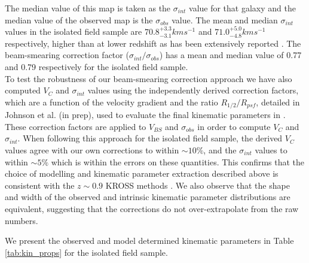 \documentclass[fleqn,usenatbib]{mn2e}
\begin{document}
The median value of this map is taken as the $\sigma_{int}$ value for that galaxy and the median value of the observed map is the $\sigma_{obs}$ value.
The mean and median $\sigma_{int}$ values in the isolated field sample are $70.8^{+3.3}_{-3.1} kms^{-1}$ and $71.0^{+5.0}_{-4.8} kms^{-1}$ respectively, higher than at lower redshift as has been extensively reported \citep[e.g.][]{Genzel2006,Genzel2008,ForsterSchreiber2009,Law2009,Gnerucci2011,Epinat2012,Wisnioski2015}.
The beam-smearing correction factor ($\sigma_{int}/\sigma_{obs}$) has a mean and median value of 0.77 and 0.79 respectively for the isolated field sample. \\

To test the robustness of our beam-smearing correction approach we have also computed $V_{C}$ and $\sigma_{int}$ values using the independently derived correction factors, which are a function of the velocity gradient and the ratio $R_{1/2}/R_{psf}$, detailed in Johnson et al. (in prep), used to evaluate the final kinematic parameters in \cite{Harrison2017}.
These correction factors are applied to $V_{BS}$ and $\sigma_{obs}$ in order to compute $V_{C}$ and $\sigma_{int}$.
When following this approach for the isolated field sample, the derived $V_{C}$ values agree with our own corrections to within $\sim10\%$, and the $\sigma_{int}$ values to within $\sim5\%$ which is within the errors on these quantities. 
This confirms that the choice of modelling and kinematic parameter extraction described above is consistent with the $z\sim0.9$ KROSS methods \citep{Harrison2017}.
We also observe that the shape and width of the observed and intrinsic kinematic parameter distributions are equivalent, suggesting that the corrections do not over-extrapolate from the raw numbers.

We present the observed and model determined kinematic parameters in Table \ref{tab:kin_props} for the isolated field sample.
\end{document}

